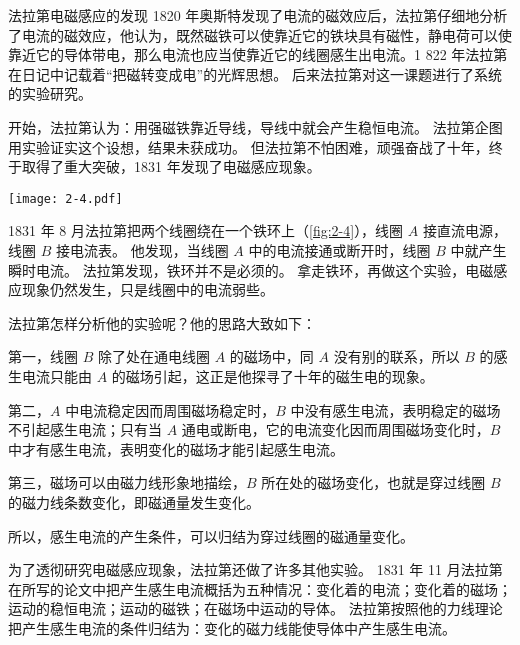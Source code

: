 \begin{Reading}{法拉第电磁感应的发现}
1820 年奥斯特发现了电流的磁效应后，法拉第仔细地分析了电流的磁效应，他认为，既然磁铁可以使靠近它的铁块具有磁性，静电荷可以使靠近它的导体带电，那么电流也应当使靠近它的线圈感生出电流。1
822 年法拉第在日记中记载着“把磁转变成电”的光辉思想。
后来法拉第对这一课题进行了系统的实验研究。

开始，法拉第认为：用强磁铁靠近导线，导线中就会产生稳恒电流。
法拉第企图用实验证实这个设想，结果未获成功。
但法拉第不怕困难，顽强奋战了十年，终于取得了重大突破，1831 年发现了电磁感应现象。
\begin{figurehere}
  \begin{minipage}{\linewidth}\centering
    \texttt{[image: 2-4.pdf]}
    \caption{}\label{fig:2-4}
  \end{minipage}
\end{figurehere}

1831 年 8 月法拉第把两个线圈绕在一个铁环上（\cref{fig:2-4}），线圈 $A$ 接直流电源，线圈 $B$ 接电流表。
他发现，当线圈 $A$ 中的电流接通或断开时，线圈 $B$ 中就产生瞬时电流。
法拉第发现，铁环并不是必须的。
拿走铁环，再做这个实验，电磁感应现象仍然发生，只是线圈中的电流弱些。

法拉第怎样分析他的实验呢？他的思路大致如下：

第一，线圈 $B$ 除了处在通电线圈 $A$ 的磁场中，同 $A$ 没有别的联系，所以 $B$ 的感生电流只能由 $A$ 的磁场引起，这正是他探寻了十年的磁生电的现象。

第二，$A$ 中电流稳定因而周围磁场稳定时，$B$ 中没有感生电流，表明稳定的磁场不引起感生电流；只有当 $A$ 通电或断电，它的电流变化因而周围磁场变化时，$B$ 中才有感生电流，表明变化的磁场才能引起感生电流。

第三，磁场可以由磁力线形象地描绘，$B$ 所在处的磁场变化，也就是穿过线圈 $B$ 的磁力线条数变化，即磁通量发生变化。

所以，感生电流的产生条件，可以归结为穿过线圈的磁通量变化。

为了透彻研究电磁感应现象，法拉第还做了许多其他实验。
1831 年 11 月法拉第在所写的论文中把产生感生电流概括为五种情况：变化着的电流；变化着的磁场；运动的稳恒电流；运动的磁铁；在磁场中运动的导体。
法拉第按照他的力线理论把产生感生电流的条件归结为：变化的磁力线能使导体中产生感生电流。
\end{Reading}

